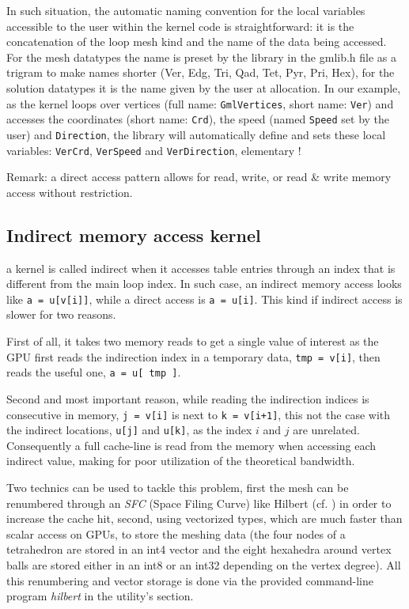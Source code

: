 \documentclass[a4paper,12pt]{article}
\begin{document}
In such situation, the automatic naming convention for the local variables accessible to the user within the kernel code is straightforward: it is the concatenation of the loop mesh kind and the name of the data being accessed. For the mesh datatypes the name is preset by the library in the gmlib.h file as a trigram to make names shorter (Ver, Edg, Tri, Qad, Tet, Pyr, Pri, Hex), for the solution datatypes it is the name given by the user at allocation. In our example, as the kernel loops over vertices (full name: {\tt GmlVertices}, short name: {\tt Ver}) and accesses the coordinates (short name: {\tt Crd}), the speed (named {\tt Speed} set by the user) and {\tt Direction}, the library will automatically define and sets these local variables: {\tt VerCrd}, {\tt VerSpeed} and {\tt VerDirection}, elementary !

Remark: a direct access pattern allows for read, write, or read \& write memory access without restriction.

\subsection{Indirect memory access kernel}
\label{sec:kernels_indirects}
a kernel is called indirect when it accesses table entries through an index that is different from the main loop index. In such case, an indirect memory access looks like {\tt a = u[v[i]]}, while a direct access is {\tt a = u[i]}. This kind if indirect access is slower for two reasons.

First of all, it takes two memory reads to get a single value of interest as the GPU first reads the indirection index in a temporary data, {\tt tmp = v[i]}, then reads the useful one, {\tt a = u[ tmp ]}.

Second and most important reason, while reading the indirection indices is consecutive in memory, {\tt j = v[i]} is next to {\tt k = v[i+1]}, this not the case with the indirect locations, {\tt u[j]} and {\tt u[k]}, as the index $i$ and $j$ are unrelated. Consequently a full cache-line is read from the memory when accessing each indirect value, making for poor utilization of the theoretical bandwidth.

Two technics can be used to tackle this problem, first the mesh can be renumbered through an \emph{SFC} (Space Filing Curve) like Hilbert (cf. \cite{peano_hilbert}) in order to increase the cache hit, second, using vectorized types, which are much faster than scalar access on GPUs, to store the meshing data (the four nodes of a tetrahedron are stored in an int4 vector and the eight hexahedra around vertex balls are stored either in an int8 or an int32 depending on the vertex degree). All this renumbering and vector storage is done via the provided command-line program \emph{hilbert} in the utility’s section.
\end{document}
